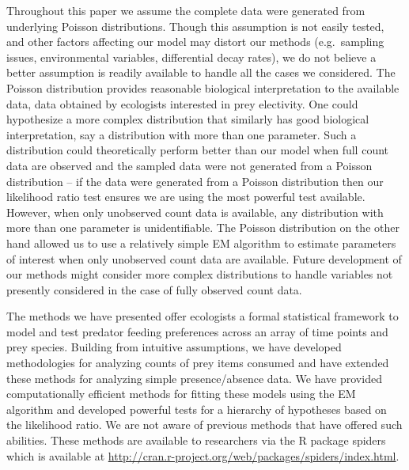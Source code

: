 \documentclass[smallextended]{svjour3}
\begin{document}
Throughout this paper we assume the complete data were generated from underlying Poisson distributions.  Though this assumption is not easily tested, and other factors affecting our model may distort our methods (e.g.\ sampling issues, environmental variables, differential decay rates), we do not believe a better assumption is readily available to handle all the cases we considered.  The Poisson distribution provides reasonable biological interpretation to the available data, data obtained by ecologists interested in prey electivity.  One could hypothesize a more complex distribution that similarly has good biological interpretation, say a distribution with more than one parameter.  Such a distribution could theoretically perform better than our model when full count data are observed and the sampled data were not generated from a Poisson distribution -- if the data were generated from a Poisson distribution then our likelihood ratio test ensures we are using the most powerful test available.  However, when only unobserved count data is available, any distribution with more than one parameter is unidentifiable.  The Poisson distribution on the other hand allowed us to use a relatively simple EM algorithm to estimate parameters of interest when only unobserved count data are available.  Future development of our methods might consider more complex distributions to handle variables not presently considered in the case of fully observed count data.

The methods we have presented offer ecologists a formal statistical framework to model and test predator feeding preferences across an array of time points and prey species. Building from intuitive assumptions, we have developed methodologies for analyzing counts of prey items consumed and have extended these methods for analyzing simple presence/absence data. We have provided computationally efficient methods for fitting these models using the EM algorithm and developed powerful tests for a hierarchy of hypotheses based on the likelihood ratio. We are not aware of previous methods that have offered such abilities. These methods are available to researchers via the R package spiders which is available at \url{http://cran.r-project.org/web/packages/spiders/index.html}.

\nocite{Wickham:2011a,Wickham:2011,Bischl:2014,Roualdes:2014}


\end{document}
